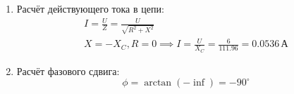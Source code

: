 \begin{enumerate}
	\item Расчёт действующего тока в цепи:
	      \[
		      \begin{gathered}
			      I = \frac{U}{Z} = \frac{U}{\sqrt{R^2 + X^2}} \\
			      X = -X_C, R = 0 \implies I = \frac{U}{X_C} = \frac{6}{111.96} = 0.0536 \, \text{А}
		      \end{gathered}
	      \]
	\item Расчёт фазового сдвига:
	      \[
		      \phi = \arctan\left(-\inf\right) = -90^{\circ}
	      \]
\end{enumerate}
